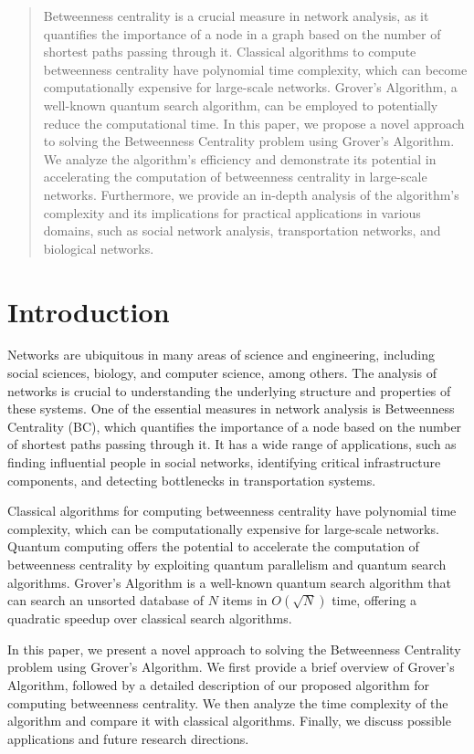 \begin{abstract}
Betweenness centrality is a crucial measure in network analysis, as it quantifies the importance of a node in a graph based on the number of shortest paths passing through it. Classical algorithms to compute betweenness centrality have polynomial time complexity, which can become computationally expensive for large-scale networks. Grover's Algorithm, a well-known quantum search algorithm, can be employed to potentially reduce the computational time. In this paper, we propose a novel approach to solving the Betweenness Centrality problem using Grover's Algorithm. We analyze the algorithm's efficiency and demonstrate its potential in accelerating the computation of betweenness centrality in large-scale networks. Furthermore, we provide an in-depth analysis of the algorithm's complexity and its implications for practical applications in various domains, such as social network analysis, transportation networks, and biological networks.
\end{abstract}

\section{Introduction}

Networks are ubiquitous in many areas of science and engineering, including social sciences, biology, and computer science, among others. The analysis of networks is crucial to understanding the underlying structure and properties of these systems. One of the essential measures in network analysis is Betweenness Centrality (BC), which quantifies the importance of a node based on the number of shortest paths passing through it. It has a wide range of applications, such as finding influential people in social networks, identifying critical infrastructure components, and detecting bottlenecks in transportation systems.

Classical algorithms for computing betweenness centrality have polynomial time complexity, which can be computationally expensive for large-scale networks. Quantum computing offers the potential to accelerate the computation of betweenness centrality by exploiting quantum parallelism and quantum search algorithms. Grover's Algorithm is a well-known quantum search algorithm that can search an unsorted database of $N$ items in $O(\sqrt{N})$ time, offering a quadratic speedup over classical search algorithms.

In this paper, we present a novel approach to solving the Betweenness Centrality problem using Grover's Algorithm. We first provide a brief overview of Grover's Algorithm, followed by a detailed description of our proposed algorithm for computing betweenness centrality. We then analyze the time complexity of the algorithm and compare it with classical algorithms. Finally, we discuss possible applications and future research directions.

